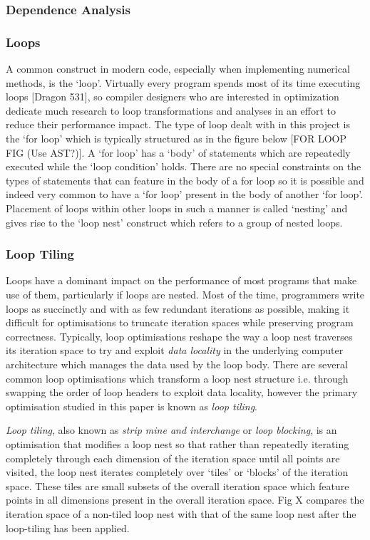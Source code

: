 \documentclass[a4paper,12pt,twoside]{report}
\begin{document}
\subsubsection{Dependence Analysis}

\subsubsection{Loops}
A common construct in modern code, especially when implementing numerical methods, is the `loop'. Virtually every program spends most of its 
time executing loops [Dragon 531], so compiler designers who are interested in optimization dedicate much research to 
loop transformations and analyses in an effort to reduce their performance impact. The type of loop dealt with in this project is the
`for loop' which is typically structured as in the figure below [FOR LOOP FIG (Use AST?)]. A `for loop' has a `body' of statements which are repeatedly executed
while the `loop condition' holds. There are no special constraints on the types of statements that can feature in the body of a for loop so it
is possible and indeed very common to have a `for loop' present in the body of another `for loop'. Placement of loops within other loops in such a manner
is called `nesting' and gives rise to the `loop nest' construct which refers to a group of nested loops.

\subsubsection{Loop Tiling}
Loops have a dominant impact on the performance of most programs that make use of them, particularly if loops are nested.
Most of the time, programmers write loops as succinctly and with as few redundant iterations as possible, making it difficult
for optimisations to truncate iteration spaces while preserving program correctness. Typically, loop optimisations reshape the
way a loop nest traverses its iteration space to try and exploit \textit{data locality} in the underlying computer architecture which
manages the data used by the loop body. There are several common loop optimisations which transform a loop nest structure i.e. through
swapping the order of loop headers to exploit data locality, however the primary optimisation studied in this paper is known as
\textit{loop tiling}.

\textit{Loop tiling}, also known as \textit{strip mine and interchange} or \textit{loop blocking}, is an optimisation that modifies 
a loop nest so that rather than repeatedly iterating completely through each dimension of the iteration space until all points are
visited, the loop nest iterates completely over `tiles' or `blocks' of the iteration space. These tiles are small subsets of the overall
iteration space which feature points in all dimensions present in the overall iteration space. Fig X compares the iteration space of a non-tiled
loop nest with that of the same loop nest after the loop-tiling has been applied.
\end{document}
